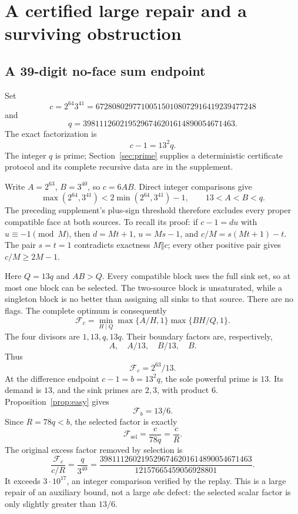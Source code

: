 \documentclass[11pt]{article}
\theoremstyle{definition}\newtheorem{definition}[theorem]{Definition}
\theoremstyle{remark}\newtheorem{remark}[theorem]{Remark}
\newcommand{\F}{\mathcal F}
\begin{document}
\clearpage
\section{A certified large repair and a surviving obstruction}
\subsection{A 39-digit no-face sum endpoint}
Set
\[
 c=2^{64}3^{41}=672808029771005150108072916419239477248
\]
and
\[
 q=3981112602195296746201614890054671463.
\]
The exact factorization is
\begin{equation}\label{eq:bigfactor}
 c-1=13^2q.
\end{equation}
The integer \(q\) is prime; Section~\ref{sec:prime} supplies a deterministic certificate protocol and its complete recursive data are in the supplement.

Write \(A=2^{63}\), \(B=3^{40}\), so \(c=6AB\). Direct integer comparisons give
\[
 \max(2^{64},3^{41})<2\min(2^{64},3^{41})-1,
 \qquad 13<A<B<q.
\]
The preceding supplement's plus-sign threshold therefore excludes every proper compatible face at both sources. To recall its proof: if \(c-1=du\) with \(u\equiv-1\pmod M\), then \(d=Mt+1\), \(u=Ms-1\), and \(c/M=s(Mt+1)-t\). The pair \(s=t=1\) contradicts exactness \(M\Vert c\); every other positive pair gives \(c/M\ge2M-1\).

Here \(Q=13q\) and \(AB>Q\). Every compatible block uses the full sink set, so at most one block can be selected. The two-source block is unsaturated, while a singleton block is no better than assigning all sinks to that source. There are no flags. The complete optimum is consequently
\[
 \F_c=\min_{H\mid Q}\max\{A/H,1\}\max\{BH/Q,1\}.
\]
The four divisors are \(1,13,q,13q\). Their boundary factors are, respectively,
\[
 A,\quad A/13,\quad B/13,\quad B.
\]
Thus
\begin{equation}\label{eq:bigplus}
 \boxed{\F_c=2^{63}/13.}
\end{equation}
At the difference endpoint \(c-1=b=13^2q\), the sole powerful prime is \(13\). Its demand is \(13\), and the sink primes are \(2,3\), with product \(6\). Proposition~\ref{prop:easy} gives
\[
 \F_b=13/6.
\]
Since \(R=78q<b\), the selected factor is exactly
\begin{equation}\label{eq:bigselect}
 \boxed{\F_{\mathrm{sel}}=\frac c{78q}=\frac cR.}
\end{equation}
The original excess factor removed by selection is
\begin{equation}\label{eq:bigwaste}
 \frac{\F_c}{c/R}=\frac q{3^{40}}
 =\frac{3981112602195296746201614890054671463}{12157665459056928801}.
\end{equation}
It exceeds \(3\cdot10^{17}\), an integer comparison verified by the replay. This is a large repair of an auxiliary bound, not a large \(abc\) defect: the selected scalar factor is only slightly greater than \(13/6\).
\end{document}
